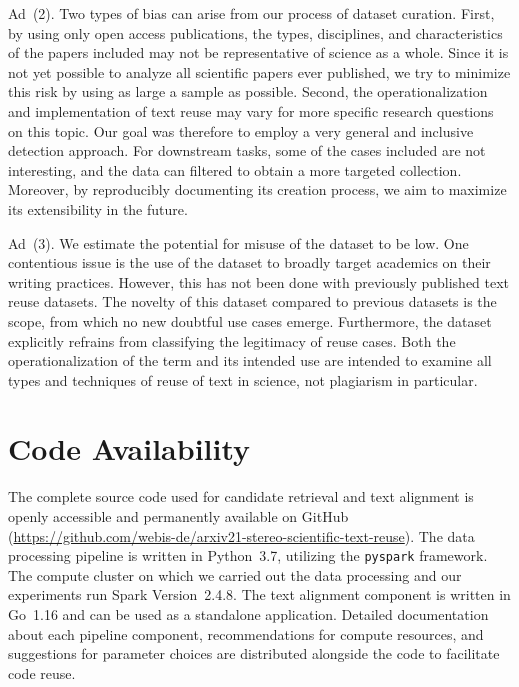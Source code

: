 \documentclass[fleqn,10pt]{wlscirep}
\begin{document}
Ad~(2). 
Two types of bias can arise from our process of dataset curation. First, by using only open access publications, the types, disciplines, and characteristics of the papers included may not be representative of science as a whole. Since it is not yet possible to analyze all scientific papers ever published, we try to minimize this risk by using as large a sample as possible. Second, the operationalization and implementation of text reuse may vary for more specific research questions on this topic. Our goal was therefore to employ a very general and inclusive detection approach. For downstream tasks, some of the cases included are not interesting, and the data can filtered to obtain a more targeted collection. Moreover, by reproducibly documenting its creation process, we aim to maximize its extensibility in the future.

Ad~(3).
We estimate the potential for misuse of the dataset to be low. One contentious issue is the use of the dataset to broadly target academics on their writing practices. However, this has not been done with previously published text reuse datasets. The novelty of this dataset compared to previous datasets is the scope, from which no new doubtful use cases emerge. Furthermore, the dataset explicitly refrains from classifying the legitimacy of reuse cases. Both the operationalization of the term and its intended use are intended to examine all types and techniques of reuse of text in science, not plagiarism in particular.


\section*{Code Availability}

The complete source code used for candidate retrieval and text alignment is openly accessible and permanently available on GitHub (\url{https://github.com/webis-de/arxiv21-stereo-scientific-text-reuse}). The data processing pipeline is written in Python~3.7, utilizing the \texttt{pyspark} framework. The compute cluster on which we carried out the data processing and our experiments run Spark Version~2.4.8. The text alignment component is written in Go~1.16 and can be used as a standalone application. Detailed documentation about each pipeline component, recommendations for compute resources, and suggestions for parameter choices are distributed alongside the code to facilitate code reuse.
\end{document}

